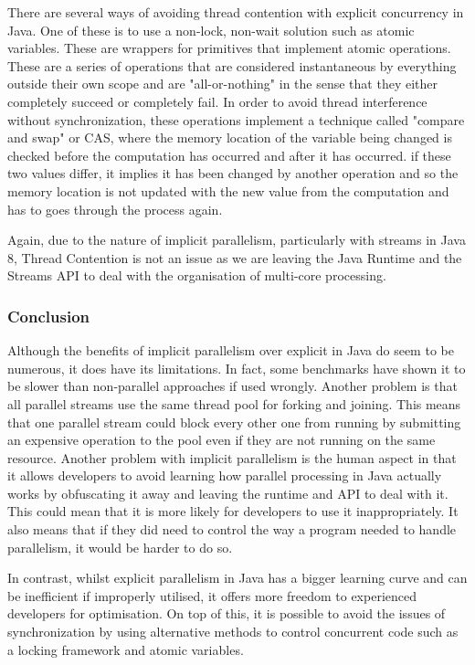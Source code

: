 \documentclass[]{report}
\begin{document}
There are several ways of avoiding thread contention with explicit concurrency in Java. One of these is to use a non-lock, non-wait solution such as atomic variables. These are wrappers for primitives that implement atomic operations. These are a series of operations that are considered instantaneous by everything outside their own scope and are "all-or-nothing" in the sense that they either completely succeed or completely fail.\cite{Atomic Variables} In order to avoid thread interference without synchronization, these operations implement a technique called "compare and swap" or CAS, where the memory location of the variable being changed is checked before the computation has occurred and after it has occurred. if these two values differ, it implies it has been changed by another operation and so the memory location is not updated with the new value from the computation and has to goes through the process again.\cite{Compare Swap}

Again, due to the nature of implicit parallelism, particularly with streams in Java 8, Thread Contention is not an issue as we are leaving the Java Runtime and the Streams API to deal with the organisation of multi-core processing.

\subsubsection{Conclusion}
Although the benefits of implicit parallelism over explicit in Java do seem to be numerous, it does have its limitations. In fact, some benchmarks have shown it to be slower than non-parallel approaches if used wrongly.\cite{Stream API} Another problem is that all parallel streams use the same thread pool for forking and joining\cite{Common Thread Pool}. This means that one parallel stream could block every other one from running by submitting an expensive operation to the pool even if they are not running on the same resource. Another problem with implicit parallelism is the human aspect in that it allows developers to avoid learning how parallel processing in Java actually works by obfuscating it away and leaving the runtime and API to deal with it. This could mean that it is more likely for developers to use it inappropriately. It also means that if they did need to control the way a program needed to handle parallelism, it would be harder to do so. 

In contrast, whilst explicit parallelism in Java has a bigger learning curve and can be inefficient if improperly utilised, it offers more freedom to experienced developers for optimisation. On top of this, it is possible to avoid the issues of synchronization by using alternative methods to control concurrent code such as a locking framework and atomic variables.
\end{document}
